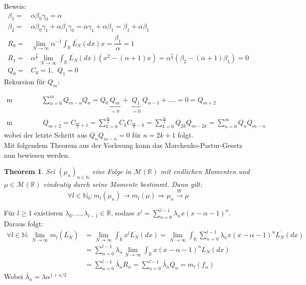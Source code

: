 \documentclass[a4paper, 11pt]{scrreprt}
\newtheorem{theorem}[defi]{Theorem}
\newcommand{\RR}{\mathbb{R}}
\newcommand{\NN}{\mathbb{N}}
\begin{document}
Beweis: \begin{align*}
\beta_1=& \alpha \beta_0 \gamma_0 = \alpha \\
\beta_2=& \alpha \beta_0 \gamma_1 + \alpha \beta_1 \gamma_0 = \alpha \gamma_1 + \alpha \beta_1 = \beta_1 + \alpha \beta_1  \\
R_0 =& \lim_{N \to \infty} \alpha^{-1} \int_{\RR}\overline{L_{N}}(dx)x = \dfrac{\beta_1}{\alpha}=1 \\
R_1 =& \alpha^{\frac{3}{2}} \lim_{N \to \infty}\int_{\RR}\overline{L_{N}}(dx)(x^2 - (\alpha +1)x)= \alpha^{\frac{3}{2}} (\beta_2 - (\alpha+1)\beta_1)=0 \\
Q_0=& C_0 =1, ~~Q_1=0
\end{align*}
Rekursion für $ Q_m: $

\begin{align*}
\text{m ungerade:}& \sum_{n=0}^m Q_{m-n}Q_n= Q_0 \underbrace{Q_m}_{\substack{=0}} + \underbrace{Q_1}_{\substack{=0}}Q_{n-1}+....= 0=Q_{m+2}\\
\text {m gerade:}&~ Q_{m+2}= C_{\frac{m}{2}+1}= \sum_{k=0}^{\frac{m}{2}} C_k C_{\frac{m}{2}-k}=\sum_{k=0}^{\frac{m}{2}} Q_{2k}Q_{m-2k}=\sum_{n=0}^{m}Q_n Q_{m-n}
\end{align*}
wobei der letzte Schritt aus $ Q_n Q_{m-n}=0 $ für $ n=2k+1 $ folgt.\\

Mit folgendem Theorem aus der Vorlesung kann das Marchenko-Pastur-Gesetz nun bewiesen werden.

\begin{theorem}
Sei \((\mu_n)_{n \in \NN}\) eine Folge in $\mathcal{M}(\RR)$ mit endlichen Momenten und $\mu \in \mathcal{M}(\RR)$ eindeutig durch seine Momente bestimmt. Dann gilt:
\[\forall l \in \NN_0: m_l(\mu_n) \rightarrow m_l(\mu) \Rightarrow \mu_n \overset{W}{\rightarrow} \mu\]
\end{theorem}

Für $l \geq 1$ existieren $\lambda_0,...,\lambda_{l-1} \in \RR$, sodass $x^l = \sum_{n=0}^{l-1} \lambda_n x (x-\alpha-1)^n$. Daraus folgt:
\begin{align*}
\forall l \in \NN: \lim_{N \to \infty} m_l(\overline{L_{N}}) 
&= \lim_{N \to \infty} \int_\RR x^l \overline{L_{N}}(dx)
= \lim_{N \to \infty} \int_\RR \sum_{n=0}^{l-1} \lambda_n x (x-\alpha-1)^n \overline{L_{N}}(dx) \\
&= \sum_{n=0}^{l-1} \lambda_n \lim_{N \to \infty} \int_\RR x (x-\alpha-1)^n \overline{L_{N}}(dx) \\
&= \sum_{n=0}^{l-1} \tilde{\lambda_n} R_n
= \sum_{n=0}^{l-1} \tilde{\lambda_n} Q_n = m_l(f_\alpha)
\end{align*}
Wobei $ \tilde{\lambda_n}= \lambda \alpha ^{1+n/2}$\\
\end{document}
